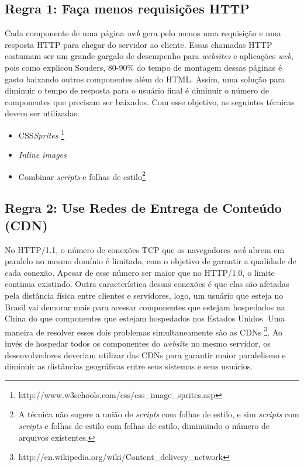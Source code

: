 \subsection{Regra 1: Faça menos requisições HTTP}
\label{subsec:highperformance_regra1}
Cada componente de uma página \textit{web} gera pelo menos uma requisição e uma resposta HTTP para chegar do servidor ao cliente. Essas chamadas HTTP costumam ser um grande gargalo de desempenho para \textit{websites} e aplicações \textit{web}, pois como explicou Souders, 80-90\% do tempo de montagem dessas páginas é gasto baixando outros componentes além do HTML. Assim, uma solução para diminuir o tempo de resposta para o usuário final é diminuir o número de componentes que precisam ser baixados. Com esse objetivo, as seguintes técnicas devem ser utilizadas:
	\begin{itemize}
		\item CSS\textit{Sprites} \footnote{http://www.w3schools.com/css/css\_image\_sprites.asp}
		\item \textit{Inline images}
		\item Combinar \textit{scripts} e folhas de estilo\footnote{A técnica não sugere a união de \textit{scripts} com folhas de estilo, e sim \textit{scripts} com \textit{scripts} e folhas de estilo com folhas de estilo, diminuindo o número de arquivos existentes.}
	\end{itemize}

\subsection{Regra 2: Use Redes de Entrega de Conteúdo (CDN)}
\label{subsec:highperformance_regra2}
No HTTP/1.1, o número de conexões TCP que os navegadores \textit{web} abrem em paralelo no mesmo domínio é limitado, com o objetivo de garantir a qualidade de cada conexão. Apesar de esse número ser maior que no HTTP/1.0, o limite continua existindo. Outra característica dessas conexões é que elas são afetadas pela distância física entre clientes e servidores, logo, um usuário que esteja no Brasil vai demorar mais para acessar componentes que estejam hospedados na China do que componentes que estejam hospedados nos Estados Unidos. Uma maneira de resolver esses dois problemas simultaneamente são as CDNs \footnote{http://en.wikipedia.org/wiki/Content\_delivery\_network}. Ao invés de hospedar todos os componentes do \textit{website} no mesmo servidor, os desenvolvedores deveriam utilizar das CDNs para garantir maior paralelismo e diminuir as distâncias geográficas entre seus sistemas e seus usuários.

